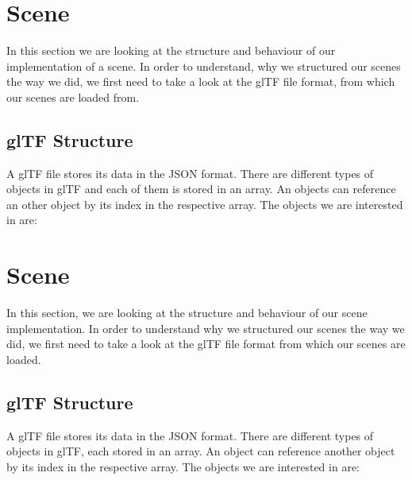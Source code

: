 
\section{Scene}

In this section we are looking at the structure and behaviour of our implementation of a scene. In order to understand, why we structured our scenes the way we did, we first need to take a look at the glTF file format, from which our scenes are loaded from.

\subsection{glTF Structure}

A glTF file stores its data in the JSON format. There are different types of objects in glTF and each of them is stored in an array. An objects can reference an other object by its index in the respective array. The objects we are interested in are:

\section{Scene}

In this section, we are looking at the structure and behaviour of our scene implementation. In order to understand why we structured our scenes the way we did, we first need to take a look at the glTF file format from which our scenes are loaded.

\subsection{glTF Structure}

A glTF file stores its data in the JSON format. There are different types of objects in glTF, each stored in an array. An object can reference another object by its index in the respective array. The objects we are interested in are:

